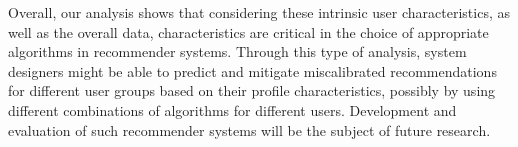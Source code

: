 Overall, our analysis shows that considering these intrinsic user characteristics, as well as the overall data, characteristics are critical in the choice of appropriate algorithms in recommender systems. Through this type of analysis, system designers might be able to predict and mitigate miscalibrated recommendations for different user groups based on their profile characteristics, possibly by using different combinations of algorithms for different users. Development and evaluation of such recommender systems will be the subject of future research.



